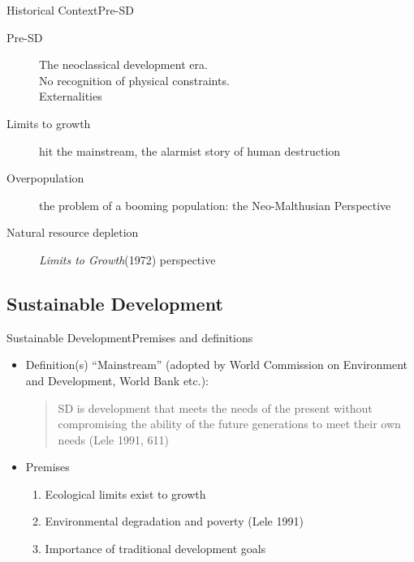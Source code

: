 \begin{frame}{Historical Context}{Pre-SD}

  \begin{description}
  
    \item [Pre-SD] The neoclassical development era.\\
	    No recognition of physical constraints.\\
	    Externalities
    \item [Limits to growth] hit the mainstream, the alarmist story of human destruction 
    \item [Overpopulation] the problem of a booming population: the Neo-Malthusian Perspective
    \item [Natural resource depletion] {\em Limits to Growth}(1972) perspective

  \end{description}
\end{frame}  


\subsection{Sustainable Development}
\begin{frame}{Sustainable Development}{Premises and definitions}

\begin{itemize}
\item Definition(s) ``Mainstream'' (adopted by World Commission on Environment and Development, World Bank etc.):
 
\begin{quotation}
SD is development that meets the needs of the present without
compromising the ability of the future generations to meet their own needs (Lele 1991, 611)
\end{quotation}

 \item  Premises
 
 
  \begin{enumerate}
   \item Ecological limits exist to growth
   \item Environmental degradation and poverty (Lele 1991) 
   \item Importance of traditional development goals
  \end{enumerate}
  
  

\end{itemize}
 
\end{frame}


